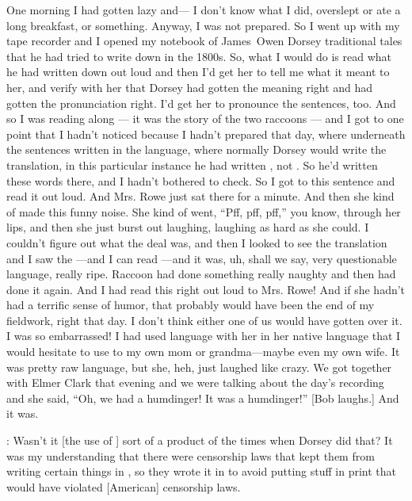 \documentclass[output=paper]{LSP/langsci}
\begin{document}
One morning I had gotten lazy and--- I don't know what I did, overslept or ate a long breakfast, or something. Anyway, I was not prepared. So I went up with my tape recorder and I opened my notebook of James~Owen Dorsey traditional tales that he had tried to write down in the 1800s. So, what I would do is read what he had written down out loud and then I'd get her to tell me what it meant to her, and verify with her that Dorsey had gotten the meaning right and had gotten the pronunciation right. I'd get her to pronounce the sentences, too. And so I was reading along --- it was the story of the two raccoons --- and I got to one point that I hadn't noticed because I hadn't prepared that day, where underneath the sentences written in the  language, where normally Dorsey would write the  translation, in this particular instance he had written , not . So he'd written these  words there, and I hadn't bothered to check. So I got to this sentence and read it out loud. And Mrs. Rowe just sat there for a minute. And then she kind of made this funny noise. She kind of went, ``Pff, pff, pff,'' you know, through her lips, and then she just burst out laughing, laughing as hard as she could. I couldn't figure out what the deal was, and then I looked to see the translation and I saw the ---and I can read ---and it was, uh, shall we say, very questionable language, really ripe. Raccoon had done something really naughty and then had done it again. And I had read this right out loud to Mrs. Rowe! And if she hadn't had a terrific sense of humor, that probably would have been the end of my fieldwork, right that day. I don't think either one of us would have gotten over it. I was so embarrassed! I had used language with her in her native language that I would hesitate to use to my own mom or grandma---maybe even my own wife. It was pretty raw language, but she, heh, just laughed like crazy. We got together with Elmer Clark that evening and we were talking about the day's recording and she said, ``Oh, we had a humdinger! It was a humdinger!'' [Bob laughs.] And it was.

: Wasn't it [the use of ] sort of a product of the times when Dorsey did that? It was my understanding that there were censorship laws that kept them from writing certain things in , so they wrote it in  to avoid putting stuff in print that would have violated [American] censorship laws.
\end{document}
